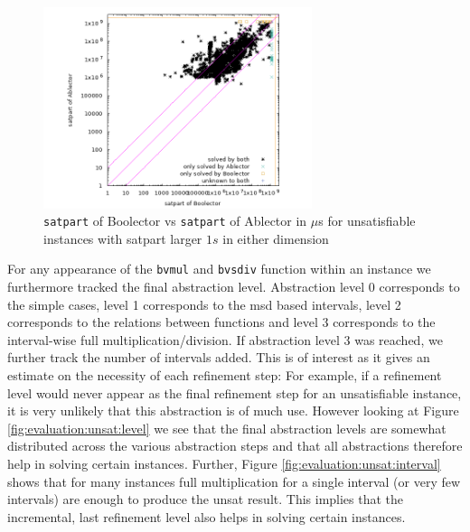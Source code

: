 \begin{figure}[]
    \centering
        \includegraphics[width=0.7\textwidth]{plots/unsat/Boolector-vs-Ablector-satpart-big.png}
    \caption{\texttt{satpart} of Boolector vs \texttt{satpart} of Ablector in $\mu$s for unsatisfiable instances with satpart larger $1s$ in either dimension}
    \label{fig:evaluation:unsat:scatter-big}
\end{figure}
For any appearance of the \texttt{bvmul} and \texttt{bvsdiv} function within an instance we furthermore tracked the final abstraction level. Abstraction level 0 corresponds to the simple cases, level 1 corresponds to the msd based intervals, level 2 corresponds to the relations between functions and level 3 corresponds to the interval-wise full multiplication/division. If abstraction level 3 was reached, we further track the number of intervals added. This is of interest as it gives an estimate on the necessity of each refinement step: For example, if a refinement level would never appear as the final refinement step for an unsatisfiable instance, it is very unlikely that this abstraction is of much use. However looking at Figure \ref{fig:evaluation:unsat:level} we see that the final abstraction levels are somewhat distributed across the various abstraction steps and that all abstractions therefore help in solving certain instances.
Further, Figure \ref{fig:evaluation:unsat:interval} shows that for many instances full multiplication for a single interval (or very few intervals) are enough to produce the unsat result. This implies that the incremental, last refinement level also helps in solving certain instances.


